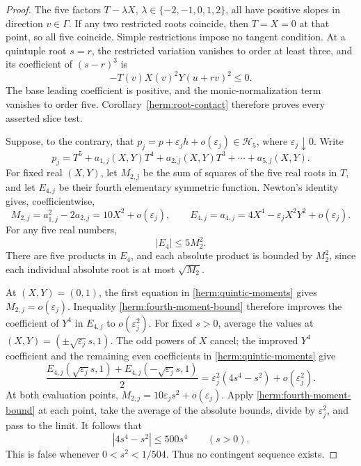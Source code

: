 \documentclass[reqno]{amsart}
\theoremstyle{definition}
\theoremstyle{remark}
\begin{document}
\begin{proof}
The five factors $T-\lambda X$,
$\lambda\in\{-2,-1,0,1,2\}$, all have positive slopes in direction
$v\in\Gamma$.  If any two restricted roots coincide, then $T=X=0$
at that point, so all five coincide.  Simple restrictions impose no
tangent condition.  At a quintuple root $s=r$, the restricted variation
vanishes to order at least three, and its coefficient of $(s-r)^3$ is
\[
       -T(v)X(v)^2Y(u+rv)^2\leq0.
\]
The base leading coefficient is positive, and the monic-normalization
term vanishes to order five.  Corollary~\ref{herm:root-contact} therefore
proves every asserted slice test.

Suppose, to the contrary, that
$p_j=p+\varepsilon_jh+o(\varepsilon_j)\in\mathcal H_5$, where
$\varepsilon_j\downarrow0$.  Write
\[
 p_j=T^5+a_{1,j}(X,Y)T^4+a_{2,j}(X,Y)T^3
             +\cdots+a_{5,j}(X,Y).
\]
For fixed real $(X,Y)$, let $M_{2,j}$ be the sum of squares of the five
real roots in $T$, and let $E_{4,j}$ be their fourth elementary
symmetric function.  Newton's identity gives, coefficientwise,
\begin{equation}
 M_{2,j}=a_{1,j}^2-2a_{2,j}=10X^2+o(\varepsilon_j),
 \qquad
 E_{4,j}=a_{4,j}=4X^4-\varepsilon_jX^2Y^2+o(\varepsilon_j).
 \label{herm:quintic-moments}
\end{equation}
For any five real numbers,
\begin{equation}
       |E_4|\leq5M_2^2.
 \label{herm:fourth-moment-bound}
\end{equation}
There are five products in $E_4$, and each absolute product is bounded
by $M_2^2$, since each individual absolute root is at most $\sqrt{M_2}$.

At $(X,Y)=(0,1)$, the first equation in
\eqref{herm:quintic-moments} gives $M_{2,j}=o(\varepsilon_j)$.
Inequality \eqref{herm:fourth-moment-bound} therefore improves the
coefficient of $Y^4$ in $E_{4,j}$ to $o(\varepsilon_j^2)$.
For fixed $s>0$, average the values at
$(X,Y)=(\pm\sqrt{\varepsilon_j}s,1)$.  The odd powers of $X$ cancel;
the improved $Y^4$ coefficient and the remaining even coefficients in
\eqref{herm:quintic-moments} give
\[
 \frac{E_{4,j}(\sqrt{\varepsilon_j}s,1)
            +E_{4,j}(-\sqrt{\varepsilon_j}s,1)}{2}
       =\varepsilon_j^2(4s^4-s^2)+o(\varepsilon_j^2).
\]
At both evaluation points,
$M_{2,j}=10\varepsilon_j s^2+o(\varepsilon_j)$.
Apply \eqref{herm:fourth-moment-bound} at each point, take the average
of the absolute bounds, divide by $\varepsilon_j^2$, and pass to the
limit.  It follows that
\[
       |4s^4-s^2|\leq500s^4\qquad(s>0).
\]
This is false whenever $0<s^2<1/504$.  Thus no contingent sequence
exists.


\end{proof}
\end{document}
